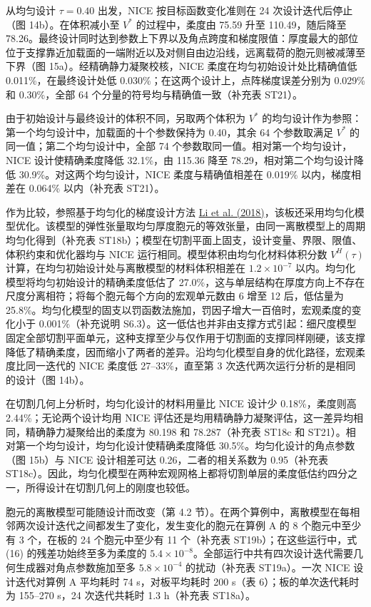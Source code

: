 \documentclass[preprint,12pt,authoryear]{elsarticle}
\begin{document}
从均匀设计 \(\tau=0.40\) 出发，NICE 按目标函数变化准则在 24 次设计迭代后停止（图 14b）。在体积减小至 \(V^*\) 的过程中，柔度由 75.59 升至 110.49，随后降至 78.26。最终设计同时达到参数上下界以及角点跨度和梯度限值：厚度最大的部位位于支撑靠近加载面的一端附近以及对侧自由边沿线，远离载荷的胞元则被减薄至下界（图 15a）。经精确静力凝聚校核，NICE 柔度在均匀初始设计处比精确值低 0.011\%，在最终设计处低 0.030\%；在这两个设计上，点阵梯度误差分别为 0.029\% 和 0.30\%，全部 64 个分量的符号均与精确值一致（补充表 ST21）。

由于初始设计与最终设计的体积不同，另取两个体积为 \(V^*\) 的均匀设计作为参照：第一个均匀设计中，加载面的十个参数保持为 0.40，其余 64 个参数取满足 \(V^*\) 的同一值；第二个均匀设计中，全部 74 个参数取同一值。相对第一个均匀设计，NICE 设计使精确柔度降低 32.1\%，由 115.36 降至 78.29，相对第二个均匀设计降低 30.9\%。对这两个均匀设计，NICE 柔度与精确值相差在 0.019\% 以内，梯度相差在 0.064\% 以内（补充表 ST21）。

作为比较，参照基于均匀化的梯度设计方法 \href{https://doi.org/10.1016/j.cad.2018.06.003}{Li et al. (2018)}，该板还采用均匀化模型优化。该模型的弹性张量取均匀厚度胞元的等效张量，由同一离散模型上的周期均匀化得到（补充表 ST18b）；模型在切割平面上固支，设计变量、界限、限值、体积约束和优化器均与 NICE 运行相同。模型体积由均匀化材料体积分数 \(V^H(\tau)\) 计算，在均匀初始设计处与离散模型的材料体积相差在 \(1.2\times10^{-7}\) 以内。均匀化模型将均匀初始设计的精确柔度低估了 27.0\%，这与单层结构在厚度方向上不存在尺度分离相符；将每个胞元每个方向的宏观单元数由 6 增至 12 后，低估量为 25.8\%。均匀化模型的固支以罚函数法施加，罚因子增大一百倍时，宏观柔度的变化小于 0.001\%（补充说明 S6.3）。这一低估也并非由支撑方式引起：细尺度模型固定全部切割平面单元，这种支撑至少与仅作用于切割面的支撑同样刚硬，该支撑降低了精确柔度，因而缩小了两者的差异。沿均匀化模型自身的优化路径，宏观柔度比同一迭代的 NICE 柔度低 27--33\%，直至第 3 次迭代两次运行分析的是相同的设计（图 14b）。

在切割几何上分析时，均匀化设计的材料用量比 NICE 设计少 0.18\%，柔度则高 2.44\%；无论两个设计均用 NICE 评估还是均用精确静力凝聚评估，这一差异均相同，精确静力凝聚给出的柔度为 80.198 和 78.287（补充表 ST18c 和 ST21）。相对第一个均匀设计，均匀化设计使精确柔度降低 30.5\%。均匀化设计的角点参数（图 15b）与 NICE 设计相差可达 0.26，二者的相关系数为 0.95（补充表 ST18c）。因此，均匀化模型在两种宏观网格上都将切割单层的柔度低估约四分之一，所得设计在切割几何上的刚度也较低。

胞元的离散模型可能随设计而改变（第 4.2 节）。在两个算例中，离散模型在每相邻两次设计迭代之间都发生了变化，发生变化的胞元在算例 A 的 8 个胞元中至少有 3 个，在板的 24 个胞元中至少有 11 个（补充表 ST19b）；在这些运行中，式 (16) 的残差功始终至多为柔度的 \(5.4\times10^{-8}\)。全部运行中共有四次设计迭代需要几何生成器对角点参数施加至多 \(5.8\times10^{-4}\) 的扰动（补充表 ST19a）。一次 NICE 设计迭代对算例 A 平均耗时 74 s，对板平均耗时 200 s（表 6）；板的单次迭代耗时为 155--270 s，24 次迭代共耗时 1.3 h（补充表 ST18a）。
\end{document}
